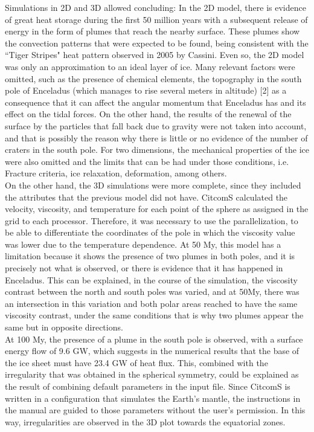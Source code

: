 \documentclass[../main.tex]{subfiles}
\begin{document}
Simulations in 2D and 3D allowed concluding: In the 2D model, there is evidence of great heat storage during the first 50 million years with a subsequent release of energy in the form of plumes that reach the nearby surface. These plumes show the convection patterns that were expected to be found, being consistent with the ``Tiger Stripes" heat pattern observed in 2005 by Cassini. Even so, the 2D model was only an approximation to an ideal layer of ice. Many relevant factors were omitted, such as the presence of chemical elements, the topography in the south pole of Enceladus (which manages to rise several meters in altitude) [2] as a consequence that it can affect the angular momentum that Enceladus has and its effect on the tidal forces. On the other hand, the results of the renewal of the surface by the particles that fall back due to gravity were not taken into account, and that is possibly the reason why there is little or no evidence of the number of craters in the south pole. For two dimensions, the mechanical properties of the ice were also omitted and the limits that can be had under those conditions, i.e. Fracture criteria, ice relaxation, deformation, among others.\\

On the other hand, the 3D simulations were more complete, since they included the attributes that the previous model did not have. CitcomS calculated the velocity, viscosity, and temperature for each point of the sphere as assigned in the grid to each processor. Therefore, it was necessary to use the parallelization, to be able to differentiate the coordinates of the pole in which the viscosity value was lower due to the temperature dependence. At 50 My, this model has a limitation because it shows the presence of two plumes in both poles, and it is precisely not what is observed, or there is evidence that it has happened in Enceladus. 
This can be explained, in the course of the simulation, the viscosity contrast between the north and south poles was varied, and at 50My, there was an intersection in this variation and both polar areas reached to have the same viscosity contrast, under the same conditions that is why two plumes appear the same but in opposite directions.\\

At 100 My, the presence of a plume in the south pole is observed, with a surface energy flow of 9.6 GW, which suggests in the numerical results that the base of the ice sheet must have 23.4 GW of heat flux. This, combined with the irregularity that was obtained in the spherical symmetry, could be explained as the result of combining default parameters in the input file. Since CitcomS is written in a configuration that simulates the Earth's mantle, the instructions in the manual are guided to those parameters without the user's permission. In this way, irregularities are observed in the 3D plot towards the equatorial zones.
\end{document}
